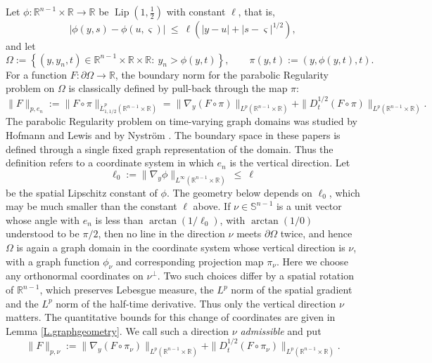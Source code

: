 \documentclass[12pt,leqno]{amsart}
\numberwithin{equation}{section}
\DeclareMathOperator{\Lip}{Lip}
\newcommand{\R}{\mathbb R}
\newcommand{\abs}[1]{\left\vert#1\right\vert}
\newcommand{\br}[1]{\left(#1\right)}
\newcommand{\set}[1]{\left\{#1\right\}}
\newcommand{\om}{\Omega}
\newcommand{\pom}{\partial\Omega}
\newcommand{\dhalf}{D_t^{1/2}}
\theoremstyle{plain}
\theoremstyle{remark}
\begin{document}
Let $\phi:\R^{n-1}\times\R\to\R$ be $\Lip(1,\tfrac12)$ with constant $\ell$,
that is,
\begin{equation}\label{E.lip}
  \abs{\phi(y,s)-\phi(u,\varsigma)}\ \le\ \ell\br{\abs{y-u}
   +\abs{s-\varsigma}^{1/2}} ,
\end{equation}
and let
\begin{equation}\label{E.dom}
  \om:=\set{(y,y_n,t)\in\R^{n-1}\times\R\times\R:\ y_n>\phi(y,t)},\qquad
  \pi(y,t):=\br{y,\phi(y,t),t} .
\end{equation}
For a function $F:\pom\to\R$, the boundary norm for the parabolic Regularity
problem on $\om$ is classically defined by pull-back through the map $\pi$:
\begin{equation}\label{E.datum}
  \|F\|_{p,e_n}:=\big\|F\circ\pi\big\|_{\dot L^p_{1,1/2}(\R^{n-1}\times\R)}
  =\|\nabla_y(F\circ\pi)\|_{L^p(\R^{n-1}\times\R)}
   +\|\dhalf(F\circ\pi)\|_{L^p(\R^{n-1}\times\R)}.
\end{equation}
The parabolic Regularity problem on time-varying graph domains was studied by
Hofmann and Lewis \cite{HL,HL99} and by Nystr\"om \cite{Nys06}. The boundary
space in these papers is defined through a single fixed graph representation
of the domain. Thus the definition refers to a coordinate system in which
$e_n$ is the vertical direction. Let
\begin{equation}\label{E.ell0}
  \ell_0:=\big\|\nabla_y\phi\big\|_{L^\infty(\R^{n-1}\times\R)}\ \le\ \ell
\end{equation}
be the spatial Lipschitz constant of $\phi$. The geometry below depends on
$\ell_0$, which may be much smaller than the constant $\ell$ above. If
$\nu\in\mathbb S^{n-1}$ is a unit vector whose angle with $e_n$ is less than
$\arctan(1/\ell_0)$, with $\arctan(1/0)$ understood to be $\pi/2$,
then no line in the direction $\nu$ meets $\pom$ twice, and hence
$\om$ is again a graph domain in the coordinate system whose vertical direction
is $\nu$, with a graph function $\phi_\nu$ and corresponding projection map
$\pi_\nu$. Here we choose any orthonormal coordinates on $\nu^\perp$. Two
such choices differ by a spatial rotation of $\R^{n-1}$, which preserves
Lebesgue measure, the $L^p$ norm of the spatial gradient and the $L^p$ norm of
the half-time derivative. Thus only the vertical direction $\nu$ matters.
The quantitative bounds for this change of coordinates are given in
Lemma \ref{L.graphgeometry}. We call such a direction $\nu$ \emph{admissible} and put
\begin{equation}\label{E.datumnu}
 \|F\|_{p,\nu}:=
 \|\nabla_y(F\circ\pi_\nu)\|_{L^p(\R^{n-1}\times\R)}
 +\|\dhalf(F\circ\pi_\nu)\|_{L^p(\R^{n-1}\times\R)}.
\end{equation}
\end{document}
